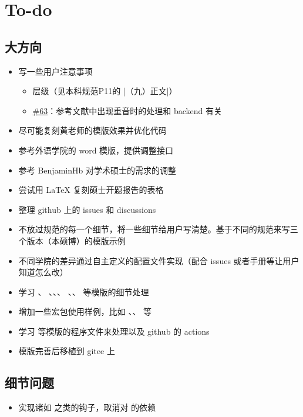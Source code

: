 
\section{To-do}

\subsection{大方向}

\begin{itemize}
  \item 写一些用户注意事项
    \begin{itemize}
      \item 层级（见本科规范P11的 |（九）正文|）
      \item \href{https://github.com/whutug/whu-thesis/issues/63}{\#63}：参考文献中出现重音时的处理和 backend 有关
    \end{itemize}
  \item 尽可能复刻黄老师的模版效果并优化代码
  \item 参考外语学院的 word 模版，提供调整接口
  \item 参考 BenjaminHb 对学术硕士的需求的调整
  \item 尝试用 \LaTeX{} 复刻硕士开题报告的表格
  \item 整理 github 上的 issues 和 discussions
  \item 不放过规范的每一个细节，将一些细节给用户写清楚。基于不同的规范来写三个版本（本硕博）的模版示例
  \item 不同学院的差异通过自主定义的配置文件实现（配合 issues 或者手册等让用户知道怎么改）
  \item 学习 、 、、、 、、 等模版的细节处理
  \item 增加一些宏包使用样例，比如 、、 等
  \item 学习  等模版的程序文件来处理以及 github 的 actions
  \item 模版完善后移植到 gitee 上
\end{itemize}

\subsection{细节问题}
\begin{itemize}
  \item 实现诸如  之类的钩子，取消对  的依赖
\end{itemize}


